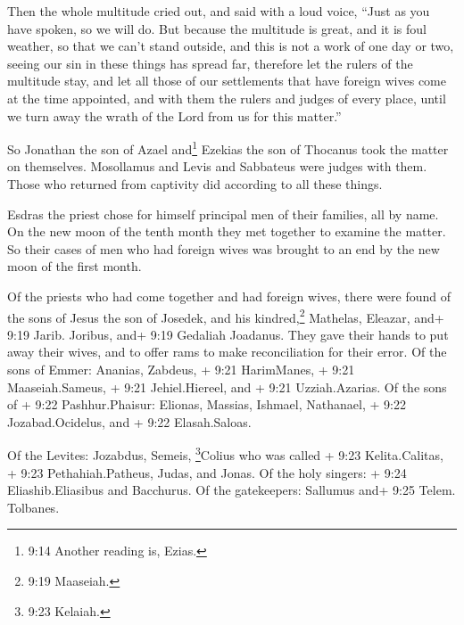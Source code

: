  Then the whole multitude cried out, and said with a loud
voice, ``Just as you have spoken, so we will do.  But
because the multitude is great, and it is foul weather, so that we can't
stand outside, and this is not a work of one day or two, seeing our sin
in these things has spread far,  therefore let the rulers
of the multitude stay, and let all those of our settlements that have
foreign wives come at the time appointed,  and with them
the rulers and judges of every place, until we turn away the wrath of
the Lord from us for this matter.''

 So Jonathan the son of Azael and\footnote{9:14 Another
  reading is, Ezias.} Ezekias the son of Thocanus took the matter on
themselves. Mosollamus and Levis and Sabbateus were judges with them.
 Those who returned from captivity did according to all
these things.

 Esdras the priest chose for himself principal men of their
families, all by name. On the new moon of the tenth month they met
together to examine the matter.  So their cases of men who
had foreign wives was brought to an end by the new moon of the first
month.

 Of the priests who had come together and had foreign
wives, there were found  of the sons of Jesus the son of
Josedek, and his kindred,\footnote{9:19 Maaseiah.} Mathelas, Eleazar,
and+ 9:19 Jarib. Joribus, and+ 9:19 Gedaliah Joadanus. 
They gave their hands to put away their wives, and to offer rams to make
reconciliation for their error.  Of the sons of Emmer:
Ananias, Zabdeus, + 9:21 HarimManes, + 9:21 Maaseiah.Sameus, + 9:21
Jehiel.Hiereel, and + 9:21 Uzziah.Azarias.  Of the sons of
+ 9:22 Pashhur.Phaisur: Elionas, Massias, Ishmael, Nathanael, + 9:22
Jozabad.Ocidelus, and + 9:22 Elasah.Saloas.

 Of the Levites: Jozabdus, Semeis, \footnote{9:23 Kelaiah.}Colius
who was called + 9:23 Kelita.Calitas, + 9:23 Pethahiah.Patheus, Judas,
and Jonas.  Of the holy singers: + 9:24 Eliashib.Eliasibus
and Bacchurus.  Of the gatekeepers: Sallumus and+ 9:25
Telem. Tolbanes.

